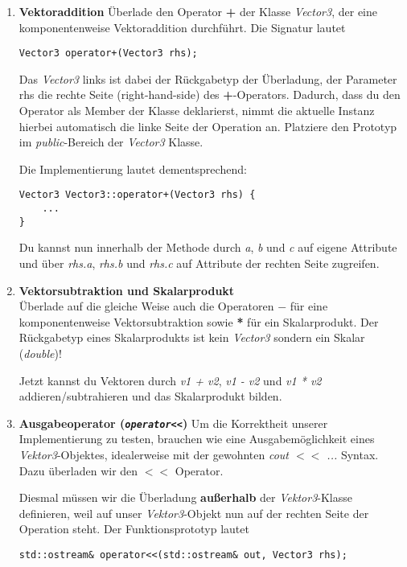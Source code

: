 \begin{enumerate}
\item\textbf{Vektoraddition}
Überlade den Operator \textbf{+} der Klasse \emph{Vector3}, der eine komponentenweise Vektoraddition durchführt.
Die Signatur lautet
\begin{lstlisting}
Vector3 operator+(Vector3 rhs);
\end{lstlisting}
Das \emph{Vector3} links ist dabei der Rückgabetyp der Überladung, der Parameter rhs die rechte Seite (\glqq right-hand-side\grqq{}) des \textbf{+}-Operators.
Dadurch, dass du den Operator als Member der Klasse deklarierst, nimmt die aktuelle Instanz hierbei automatisch die linke Seite der Operation an.
Platziere den Prototyp im \emph{public}-Bereich der \emph{Vector3} Klasse.

Die Implementierung lautet dementsprechend:
\begin{lstlisting}
Vector3 Vector3::operator+(Vector3 rhs) {
	...
}
\end{lstlisting}

Du kannst nun innerhalb der Methode durch \emph{a}, \emph{b} und \emph{c} auf eigene Attribute und über  \emph{rhs.a}, \emph{rhs.b} und \emph{rhs.c} auf Attribute der rechten Seite zugreifen.

\item\textbf{Vektorsubtraktion und Skalarprodukt}\\[0ex]
Überlade auf die gleiche Weise auch die Operatoren $-$ für eine komponentenweise Vektorsubtraktion sowie \textbf{*} für ein Skalarprodukt.
Der Rückgabetyp eines Skalarprodukts ist kein \emph{Vector3} sondern ein Skalar (\emph{double})!

Jetzt kannst du Vektoren durch \emph{v1 + v2}, \emph{v1 - v2} und \emph{v1 * v2} addieren/subtrahieren und das Skalarprodukt bilden.

\item\textbf{Ausgabeoperator (\emph{\texttt{operator<<}})}
Um die Korrektheit unserer Implementierung zu testen, brauchen wie eine Ausgabemöglichkeit eines \emph{Vektor3}-Objektes, idealerweise mit der gewohnten \emph{cout \textbf{$<<$} ...} Syntax.
Dazu überladen wir den \textbf{$<<$} Operator.

Diesmal müssen wir die Überladung \textbf{außerhalb} der \emph{Vektor3}-Klasse definieren, weil auf unser \emph{Vektor3}-Objekt nun auf der rechten Seite der Operation steht. Der Funktionsprototyp lautet 
\begin{lstlisting}
std::ostream& operator<<(std::ostream& out, Vector3 rhs);
\end{lstlisting}


\end{enumerate}
